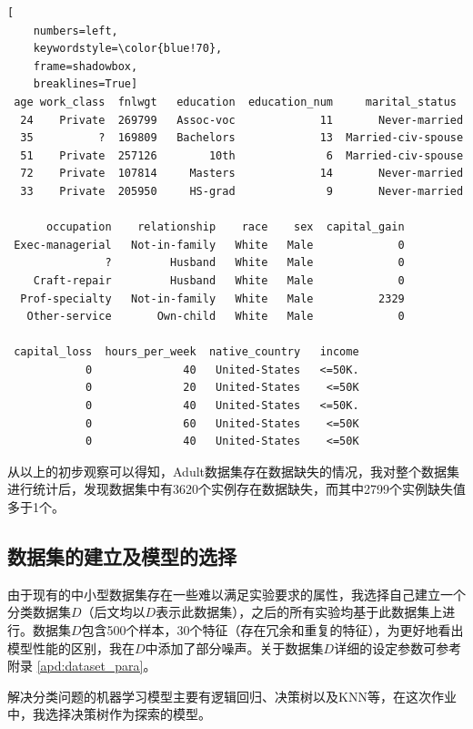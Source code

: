 \documentclass[12pt,a4paper]{article}
\theoremstyle{definition}
\begin{document}
\vspace{0.01\linewidth}
	\begin{lstlisting}[
	numbers=left,
	keywordstyle=\color{blue!70},
	frame=shadowbox,
	breaklines=True]
 age work_class  fnlwgt   education  education_num     marital_status
  24    Private  269799   Assoc-voc             11       Never-married   
  35          ?  169809   Bachelors             13  Married-civ-spouse   
  51    Private  257126        10th              6  Married-civ-spouse   
  72    Private  107814     Masters             14       Never-married   
  33    Private  205950     HS-grad              9       Never-married   

      occupation    relationship    race    sex  capital_gain
 Exec-managerial   Not-in-family   White   Male             0   
               ?         Husband   White   Male             0   
    Craft-repair         Husband   White   Male             0   
  Prof-specialty   Not-in-family   White   Male          2329   
   Other-service       Own-child   White   Male             0   

 capital_loss  hours_per_week  native_country   income  
            0              40   United-States   <=50K.  
            0              20   United-States    <=50K
            0              40   United-States   <=50K.  
            0              60   United-States    <=50K  
            0              40   United-States    <=50K   
	\end{lstlisting}
	
\vspace{0.01\linewidth}
从以上的初步观察可以得知，Adult数据集存在数据缺失的情况，我对整个数据集进行统计后，发现数据集中有3620个实例存在数据缺失，而其中2799个实例缺失值多于1个。

\subsection{数据集的建立及模型的选择}

由于现有的中小型数据集存在一些难以满足实验要求的属性，我选择自己建立一个分类数据集$D$（后文均以$D$表示此数据集），之后的所有实验均基于此数据集上进行。数据集$D$包含500个样本，30个特征（存在冗余和重复的特征），为更好地看出模型性能的区别，我在$D$中添加了部分噪声。关于数据集$D$详细的设定参数可参考附录 \ref{apd:dataset_para}。

\vspace{0.015\linewidth}
解决分类问题的机器学习模型主要有逻辑回归、决策树以及KNN等，在这次作业中，我选择决策树作为探索的模型。
\end{document}
